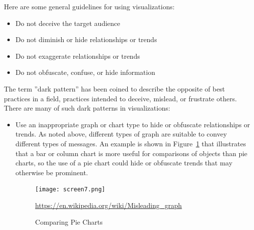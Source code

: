 Here are some general guidelines for using visualizations:
\begin{itemize}
   \item Do not deceive the target audience
   \item Do not diminish or hide relationships or trends
   \item Do not exaggerate relationships or trends
   \item Do not obfuscate, confuse, or hide information
\end{itemize}

The term ''dark pattern'' has been coined to describe the opposite of best practices in a field, practices intended to deceive, mislead, or frustrate others. There are many of such dark patterns in visualizations:

\begin{itemize}
	\item Use an inappropriate graph or chart type to hide or obfuscate relationships or trends. As noted above, different types of graph are suitable to convey different types of messages. An example is shown in Figure~\ref{fig:comparingpies} that illustrates that a bar or column chart is more useful for comparisons of objects than pie charts, so the use of a pie chart could hide or obfuscate trends that may otherwise be prominent.
	
\begin{figure}
\centering
\texttt{[image: screen7.png]}

\scriptsize\url{https://en.wikipedia.org/wiki/Misleading_graph}
\caption{Comparing Pie Charts}
\label{fig:comparingpies}
\end{figure}


\end{itemize}
